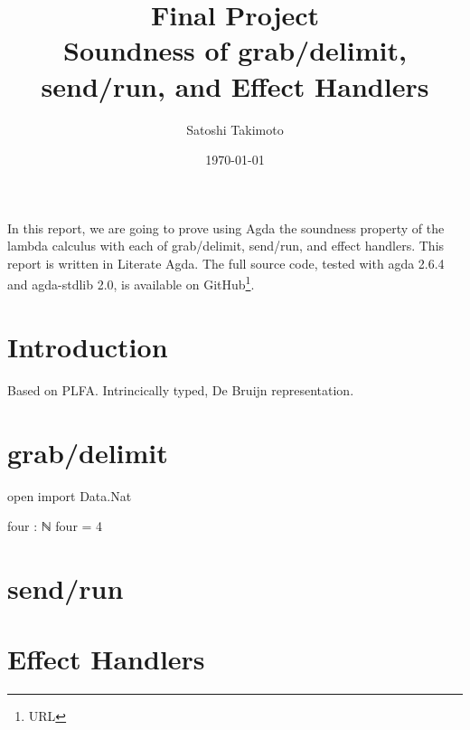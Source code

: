 \documentclass[a4paper,11pt]{article}
\title{{\large{Final Project}}\\Soundness of grab/delimit, send/run, and Effect Handlers}
\date{\today}
\author{Satoshi Takimoto}
\begin{document}
\maketitle

In this report, we are going to prove using Agda the soundness property of the lambda calculus with each of grab/delimit, send/run, and effect handlers.
This report is written in Literate Agda. The full source code, tested with agda 2.6.4 and agda-stdlib 2.0, is available on GitHub\footnote[1]{URL}.

\section{Introduction}

Based on PLFA\cite{plfa22.08}. Intrincically typed, De Bruijn representation.

\section{grab/delimit}

\begin{code}[hide]
open import Data.Nat
\end{code}

\begin{code}
four : ℕ
four = 4
\end{code}

\section{send/run}

\section{Effect Handlers}



\end{document}
